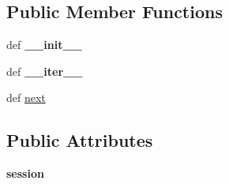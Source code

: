 \subsection*{Public Member Functions}
\begin{DoxyCompactItemize}
\item 
\hypertarget{classcheshire3_1_1sql_1_1postgres_store_1_1_postgres_iter_a02e4133fce810b2f3fc9ded51078bf24}{def {\bfseries \-\_\-\-\_\-init\-\_\-\-\_\-}}\label{classcheshire3_1_1sql_1_1postgres_store_1_1_postgres_iter_a02e4133fce810b2f3fc9ded51078bf24}

\item 
\hypertarget{classcheshire3_1_1sql_1_1postgres_store_1_1_postgres_iter_aba3b2382b24932ba70449ce135e6821d}{def {\bfseries \-\_\-\-\_\-iter\-\_\-\-\_\-}}\label{classcheshire3_1_1sql_1_1postgres_store_1_1_postgres_iter_aba3b2382b24932ba70449ce135e6821d}

\item 
def \hyperlink{classcheshire3_1_1sql_1_1postgres_store_1_1_postgres_iter_a3125d17d0e94ce1458afe5eec0294cce}{next}
\end{DoxyCompactItemize}
\subsection*{Public Attributes}
\begin{DoxyCompactItemize}
\item 
\hypertarget{classcheshire3_1_1sql_1_1postgres_store_1_1_postgres_iter_aca5707743c38b6c3c849c23f6fd2254e}{{\bfseries session}}\label{classcheshire3_1_1sql_1_1postgres_store_1_1_postgres_iter_aca5707743c38b6c3c849c23f6fd2254e}

\end{DoxyCompactItemize}
